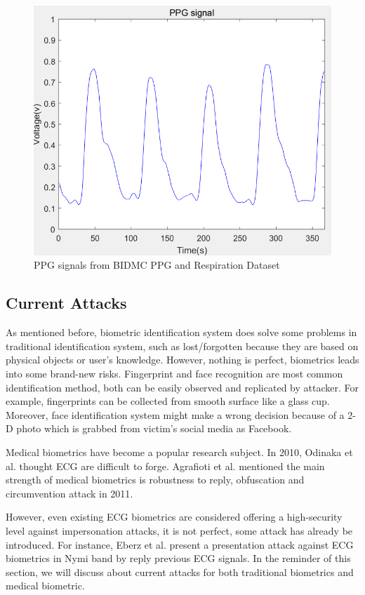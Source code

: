 \documentclass[a4paper,12pt]{article}
\begin{document}
\begin{figure}[H]
\centering
\includegraphics[width = .8\textwidth]{ppg.PNG}
\caption{PPG signals from BIDMC PPG and Respiration Dataset\autocite{PhysioNet}}
\label{fig:ppg}
\end{figure}

\subsection{Current Attacks}
As mentioned before, biometric identification system does solve some problems in traditional identification system, such as lost/forgotten because they are based on physical objects or user's knowledge. However, nothing is perfect, biometrics leads into some brand-new risks. Fingerprint and face recognition are most common identification method, both can be easily observed and replicated by attacker\parencite{Eberz:2018your}. For example, fingerprints can be collected from smooth surface like a glass cup. Moreover, face identification system might make a wrong decision because of a 2-D photo which is grabbed from victim's social media as Facebook.

Medical biometrics have become a popular research subject. In 2010, Odinaka et al. thought ECG are difficult to forge\parencite{Odinaka:2010ecg}. Agrafioti et al. mentioned the main strength of medical biometrics is robustness to reply, obfuscation and circumvention attack in 2011\parencite{Agrafioti:2011heart}.

However, even existing ECG biometrics are considered offering a high-security level against impersonation attacks\parencite{Blasco:2018feasibility}, it is not perfect, some attack has already be introduced. For instance, Eberz et al. present a presentation attack against ECG biometrics in Nymi band by reply previous ECG signals\parencite{Eberz:2017broken}. In the reminder of this section, we will discuss about current attacks for both traditional biometrics and medical biometric.
\end{document}
